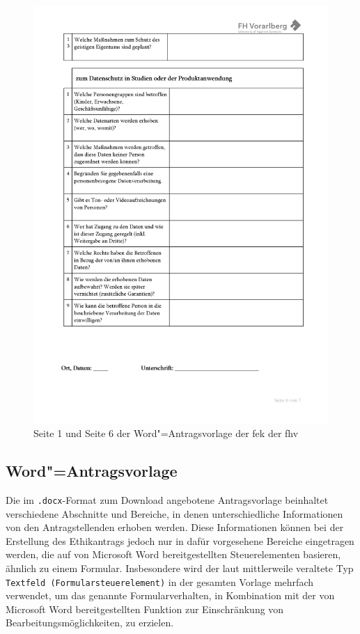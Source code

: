 \documentclass[a4paper,12pt,twoside,numbers=noendperiod]{scrreprt}
\begin{document}
\begin{figure}[ht]
\begin{minipage}[b]{.49\linewidth}
        \includegraphics[width=\linewidth]{thesis/images/Luidold_Word-Vorlage-FHV-2.png}
    \end{minipage}
    \caption[{Seite 1 und Seite 6 der Word"=Antragsvorlage der \acl{fek} der \acl{fhv}}]{Seite 1 und Seite 6 der Word"=Antragsvorlage der \acl{fek} der \acl{fhv} \cite{fachhochschule_vorarlberg_gmbh_forschungsethik-kommission_2021}}
    \label{fig:dokumentenvorlage-fek}
\end{figure}

\subsection{Word"=Antragsvorlage}
\label{sub-sec:technischer-aufbau-word-antragsvorlage}

Die im \texttt{.docx}-Format zum Download angebotene Antragsvorlage beinhaltet verschiedene Abschnitte und Bereiche, in denen unterschiedliche Informationen von den Antragstellenden erhoben werden. Diese Informationen können bei der Erstellung des Ethikantrags jedoch nur in dafür vorgesehene Bereiche eingetragen werden, die auf von Microsoft Word bereitgestellten Steuerelementen basieren, ähnlich zu einem Formular. Insbesondere wird der laut \cite{ay_textfelder_2023} mittlerweile veraltete Typ \texttt{Textfeld (Formularsteuerelement)} in der gesamten Vorlage mehrfach verwendet, um das genannte Formularverhalten, in Kombination mit der von Microsoft Word bereitgestellten Funktion zur Einschränkung von Bearbeitungsmöglichkeiten, zu erzielen.
\end{document}
